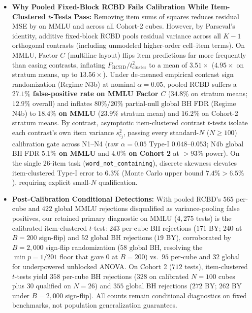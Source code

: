 \documentclass[11pt,a4paper]{article}
\begin{document}
\begin{itemize}[leftmargin=*,nosep]
    \item \textbf{Why Pooled Fixed-Block RCBD Fails Calibration While Item-Clustered $t$-Tests Pass:} Removing item sums of squares reduces residual MSE by \MmluMseReductionMean{} on MMLU and \SlabMseReductionMean{} across all \SlabMseSummaryCubes{} Cohort-2 cubes. However, by Parseval's identity, additive fixed-block RCBD pools residual variance across all $K-1$ orthogonal contrasts (including unmodeled higher-order cell--item terms). On MMLU, Factor $C$ (multiline layout) flips item predictions far more frequently than casing contrasts, inflating $F_{\mathrm{RCBD}} / t_{\mathrm{cluster}}^2$ to a mean of $3.51\times$ ($4.95\times$ on stratum means, up to $13.56\times$). Under de-meaned empirical contrast sign randomization (Regime N3b) at nominal $\alpha=0.05$, pooled RCBD suffers a \textbf{$27.1\%$ false-positive rate on MMLU Factor $C$} ($34.8\%$ on stratum means; $12.9\%$ overall) and inflates 80\%/20\% partial-null global BH FDR (Regime N4b) to \textbf{$18.4\%$ on MMLU} ($23.9\%$ stratum mean) and $16.2\%$ on Cohort-2 stratum means. By contrast, asymptotic item-clustered contrast $t$-tests isolate each contrast's own item variance $s_{c_j}^2$, passing every standard-$N$ ($N \ge 100$) calibration gate across N1--N4 (raw $\alpha=0.05$ Type-I $0.048$--$0.053$; N4b global BH FDR \textbf{$5.1\%$ on MMLU} and \textbf{$4.0\%$ on Cohort 2} at $>93\%$ power). On the single 26-item task (\texttt{word\_not\_containing}), discrete skewness elevates item-clustered Type-I error to $6.3\%$ (Monte Carlo upper bound $7.4\% > 6.5\%$), requiring explicit small-$N$ qualification.
    \item \textbf{Post-Calibration Conditional Detections:} With pooled RCBD's $565$ per-cube and $422$ global MMLU rejections disqualified as variance-pooling false positives, our retained primary diagnostic on MMLU ($4{,}275$ tests) is the calibrated item-clustered $t$-test: $243$ per-cube BH rejections ($171$ BY; $240$ at $B=200$ sign-flip) and $52$ global BH rejections ($19$ BY), corroborated by $B=2{,}000$ sign-flip randomization ($58$ global BH, resolving the $\min p = 1/201$ floor that gave $0$ at $B=200$) vs.\ $95$ per-cube and $32$ global for underpowered unblocked ANOVA. On Cohort 2 ($712$ tests), item-clustered $t$-tests yield $358$ per-cube BH rejections ($328$ on calibrated $N=100$ cubes plus $30$ qualified on $N=26$) and $355$ global BH rejections ($272$ BY; $262$ BY under $B=2{,}000$ sign-flip). All counts remain conditional diagnostics on fixed benchmarks, not population generalization guarantees.
\end{itemize}
\end{document}
